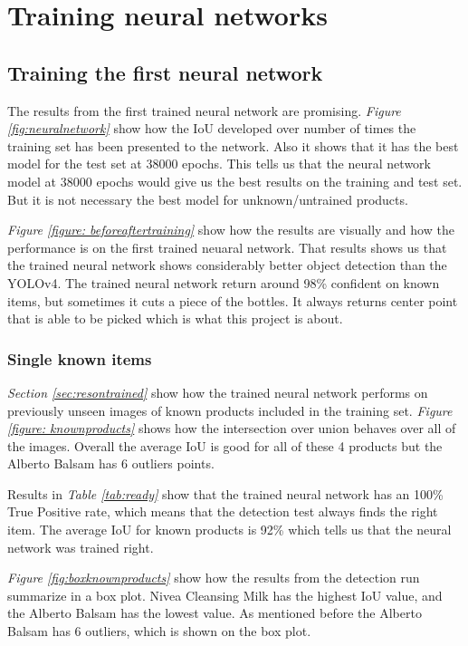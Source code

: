 \section{Training neural networks} 
\subsection{Training the first neural network}
The results from the first trained neural network are promising. \textit{Figure \ref{fig:neuralnetwork}} show how the IoU developed over number of times the training set has been presented to the network. Also it shows that it has the best model for the test set at 38000 epochs. This tells us that the neural network model at 38000 epochs would give us the best results on the training and test set. But it is not necessary the best model for unknown/untrained products.

\textit{Figure \ref{figure: beforeaftertraining}} show how the results are visually and how the performance is on the first trained neuaral network. That results shows us that the trained neural network shows considerably better object detection than the YOLOv4. The trained neural network return around 98\% confident on known items, but sometimes it cuts a piece of the bottles. It always returns center point that is able to be picked which is what this project is about. 


\subsubsection{Single known items}
\textit{Section \ref{sec:resontrained}} show how the trained neural network performs on previously unseen images of known products included in the training set. \textit{Figure \ref{figure: knownproducts}} shows how the intersection over union behaves over all of the images. Overall the average IoU is good for all of these 4 products but the Alberto Balsam has 6 outliers points.%

Results in \textit{Table \ref{tab:ready}} show that the trained neural network has an 100\% True Positive rate, which means that the detection test always finds the right item. The average IoU for known products is 92\% which tells us that the neural network was trained right.

\textit{Figure \ref{fig:boxknownproducts}} show how the results from the detection run summarize in a box plot. Nivea Cleansing Milk has the highest IoU value, and the Alberto Balsam has the lowest value. As mentioned before the Alberto Balsam has 6 outliers, which is shown on the box plot.

